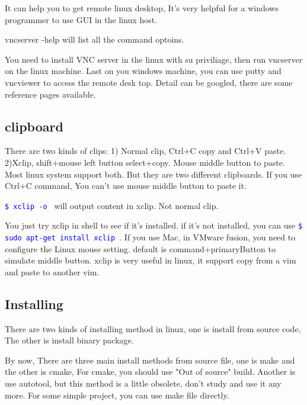 \documentclass[paper=8.5in:11in, twoside, 12pt, pagesize=pdftex]{book}
\newcommand{\linuxcommand}[1]{\texttt{\textcolor{blue}{\$ #1 \Pisymbol{psy}{191}}}}
\begin{document}
 \par It can help you to get remote linux desktop, It's very helpful for a windows programmer to use GUI in the linux host.
 
 \par vncserver -help will list all the command optoins.
 
 \par You need to install VNC server in the linux with su priviliage, then run vncserver on the linux machine. Last on you windows machine, you can use putty and vncviewer to access the remote desk top. Detail can be googled, there are some reference pages available.

\subsection{clipboard}

	\par There are two kinds of clips: 1) Normal clip, Ctrl+C copy and Ctrl+V paste. 2)Xclip, shift+mouse left button select+copy. Mouse middle button to paste. Most linux system support both. But they are two different clipboards. If you use Ctrl+C command, You can't use mouse middle button to paste it.
			
	\par \linuxcommand{xclip -o} will output content in xclip. Not normal clip.
					
	\par You just try xclip in shell to see if it's installed. if it's not installed, you can use \linuxcommand{sudo apt-get install xclip}. If you use Mac, in VMware fusion, you need to configure the Linux mouse setting.  default is command+primaryButton to simulate middle button.  xclip is very useful in linux, it support copy from a vim and paste to another vim.  

\subsection{Installing}

	\par There are two kinds of installing method in linux, one is install from source code, The other is install binary package.

	\par By now, There are three main install methods from source file, one is make and the other is cmake, For cmake, you should use "Out of source" build. Another is use autotool, but this method is a little obsolete, don't study and use it any more. For some simple project, you can use make file directly. 
\end{document}
